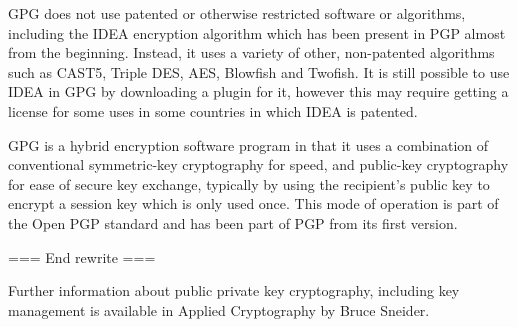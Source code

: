 GPG does not use patented or otherwise restricted software or
algorithms, including the IDEA encryption algorithm which has been
present in PGP almost from the beginning. Instead, it uses a variety of
other, non-patented algorithms such as CAST5, Triple DES, AES, Blowfish
and Twofish. It is still possible to use IDEA in GPG by downloading a
plugin for it, however this may require getting a license for some uses
in some countries in which IDEA is patented.

GPG is a hybrid encryption software program in that it uses a
combination of conventional symmetric-key cryptography for speed, and
public-key cryptography for ease of secure key exchange, typically by
using the recipient's public key to encrypt a session key which is only
used once. This mode of operation is part of the Open PGP standard and
has been part of PGP from its first version.

=== End rewrite ===

Further information about public private key cryptography, including key
management is available in Applied Cryptography by Bruce Sneider.
